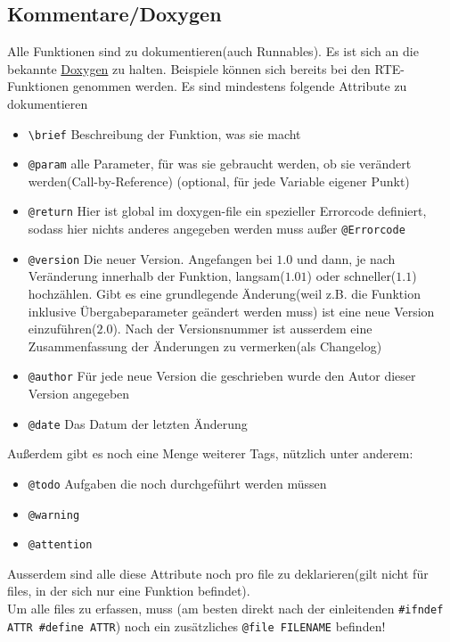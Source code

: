 \documentclass[]{scrartcl}
\begin{document}
\subsection{Kommentare/Doxygen}
Alle Funktionen sind zu dokumentieren(auch Runnables). Es ist sich an die bekannte \href{http://www.stack.nl/~dimitri/doxygen/}{Doxygen} zu halten. Beispiele können sich bereits bei den RTE-Funktionen genommen werden. Es sind mindestens folgende Attribute zu dokumentieren
\begin{itemize}
\item \lstinline|\brief| Beschreibung der Funktion, was sie macht
\item \lstinline|@param| alle Parameter, für was sie gebraucht werden, ob sie verändert werden(Call-by-Reference) (optional, für jede Variable eigener Punkt)
\item \lstinline|@return| Hier ist global im doxygen-file ein spezieller Errorcode definiert, sodass hier nichts anderes angegeben werden muss außer \lstinline|@Errorcode|
\item \lstinline|@version| Die neuer Version. Angefangen bei $1.0$ und dann, je nach Veränderung innerhalb der Funktion, langsam($1.01$) oder schneller($1.1$) hochzählen. Gibt es eine grundlegende Änderung(weil z.B. die Funktion inklusive Übergabeparameter geändert werden muss) ist eine neue Version einzuführen($2.0$). Nach der Versionsnummer ist ausserdem eine Zusammenfassung der Änderungen zu vermerken(als Changelog)
\item \lstinline|@author| Für jede neue Version die geschrieben wurde den Autor dieser Version angegeben
\item \lstinline|@date| Das Datum der letzten Änderung
\end{itemize}
Außerdem gibt es noch eine Menge weiterer Tags, nützlich unter anderem:
\begin{itemize}
\item \lstinline|@todo| Aufgaben die noch durchgeführt werden müssen
\item \lstinline|@warning|
\item \lstinline|@attention|
\end{itemize}
Ausserdem sind alle diese Attribute noch pro file zu deklarieren(gilt nicht für files, in der sich nur eine Funktion befindet).\\
Um alle files zu erfassen, muss (am besten direkt nach der einleitenden \lstinline|#ifndef ATTR #define ATTR|) noch ein zusätzliches \lstinline|@file FILENAME| befinden!
\end{document}
